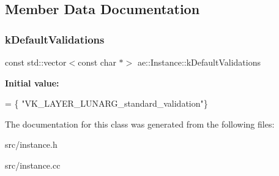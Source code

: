 \subsection{Member Data Documentation}
\hypertarget{classae_1_1_instance_a51fa0c0f46de73754c52841fc458d4ac}{}\label{classae_1_1_instance_a51fa0c0f46de73754c52841fc458d4ac} 
\subsubsection{\texorpdfstring{k\+Default\+Validations}{kDefaultValidations}}
{\footnotesize\ttfamily const std\+::vector$<$const char $\ast$$>$ ae\+::\+Instance\+::k\+Default\+Validations}

{\bfseries Initial value\+:}
\begin{DoxyCode}
= \{
        \textcolor{stringliteral}{"VK\_LAYER\_LUNARG\_standard\_validation"}\}
\end{DoxyCode}


The documentation for this class was generated from the following files\+:\begin{DoxyCompactItemize}
\item 
src/instance.\+h\item 
src/instance.\+cc\end{DoxyCompactItemize}

